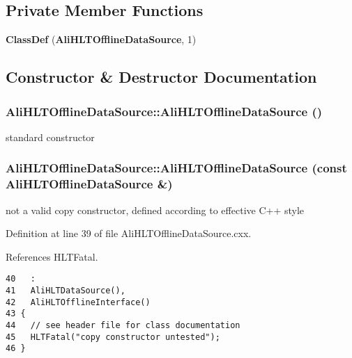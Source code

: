 \subsection*{Private Member Functions}
\begin{CompactItemize}
\item 
{\bf Class\-Def} ({\bf Ali\-HLTOffline\-Data\-Source}, 1)
\end{CompactItemize}


\subsection{Constructor \& Destructor Documentation}
\subsubsection{\setlength{\rightskip}{0pt plus 5cm}Ali\-HLTOffline\-Data\-Source::Ali\-HLTOffline\-Data\-Source ()}\label{classAliHLTOfflineDataSource_a0}


standard constructor 
\subsubsection{\setlength{\rightskip}{0pt plus 5cm}Ali\-HLTOffline\-Data\-Source::Ali\-HLTOffline\-Data\-Source (const {\bf Ali\-HLTOffline\-Data\-Source} \&)}\label{classAliHLTOfflineDataSource_a1}


not a valid copy constructor, defined according to effective C++ style 

Definition at line 39 of file Ali\-HLTOffline\-Data\-Source.cxx.

References HLTFatal.

\footnotesize\begin{verbatim}40   :
41   AliHLTDataSource(),
42   AliHLTOfflineInterface()
43 {
44   // see header file for class documentation
45   HLTFatal("copy constructor untested");
46 }

\end{verbatim}\normalsize 


